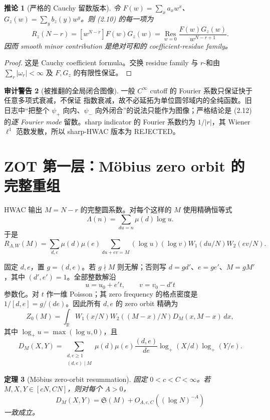 \documentclass[11pt,a4paper]{ctexart}
\newtheorem{theorem}{定理}[section]
\newtheorem{corollary}[theorem]{推论}
\theoremstyle{definition}
\newtheorem{warning}[theorem]{审计警告}
\newcommand{\1}{\mathbf 1}
\newcommand{\Res}{\operatorname*{Res}}
\newcommand{\REJECTED}{\textcolor{purple!75!black}{\textsf{REJECTED}}}
\begin{document}
\begin{corollary}[严格的 Cauchy 留数版本]
令 $F(w)=\sum_xa_xw^x$、$G_z(w)=\sum_yb_z(y)w^y$。则 (2.10) 的每一项为
\[
R_z(N-r)=[w^{N-r}]F(w)G_z(w)
=\Res_{w=0}\frac{F(w)G_z(w)}{w^{N-r+1}}.                \tag{2.12}
\]
因而 smooth minor contribution 是绝对可和的 coefficient-residue family。
\end{corollary}

\begin{proof}
这是 Cauchy coefficient formula。交换 residue family 与 $r$-和由
$\sum_r|\omega_r|<\infty$ 及 $F,G_z$ 的有限性保证。
\end{proof}

\begin{warning}[被推翻的全局闭合图像]
\sloppy
一般 $C^\infty$ cutoff 的 Fourier 系数只保证快于任意多项式衰减，不保证
指数衰减，故不必延拓为单位圆邻域内的全纯函数。旧日志中“把整个
$\psi_+$ 向内、$\psi_-$ 向外闭合”的说法只能作为图像；严格结论是
(2.12) 的\emph{逐 Fourier mode} 留数。sharp indicator 的 Fourier 系数约为
$1/|r|$，其 Wiener $\ell^1$ 范数发散，所以 sharp-HWAC 版本为 \REJECTED。
\end{warning}

\section{ZOT 第一层：Möbius zero orbit 的完整重组}

HWAC 输出 $M=N-r$ 的完整圆系数。对每个这样的 $M$ 使用精确恒等式
\[
\Lambda(n)=\sum_{du=n}\mu(d)\log u.                    \tag{3.1}
\]
于是
\[
R_{\Lambda,W}(M)
=\sum_{d,e}\mu(d)\mu(e)
 \sum_{du+ev=M}(\log u)(\log v)
 W_1(du/N)W_2(ev/N).                                    \tag{3.2}
\]

固定 $d,e$，置 $g=(d,e)$。若 $g\nmid M$ 则无解；否则写
$d=gd'$、$e=ge'$、$M=gM'$，其中 $(d',e')=1$。全部整数解沿
\[
u=u_0+e't,\qquad v=v_0-d't                              \tag{3.3}
\]
参数化。对 $t$ 作一维 Poisson；其 zero frequency 的格点密度是
$1/[d,e]=g/(de)$。因此所有 $d,e$ 的 zero orbit 精确为
\[
Z_0(M)=\int_{\mathbb R}W_1(x/N)W_2((M-x)/N)
D_M(x,M-x)\,dx,                                         \tag{3.4}
\]
其中 $\log_+u=\max(\log u,0)$，且
\[
D_M(X,Y)=
\sum_{\substack{d,e\ge1\\(d,e)\mid M}}
\mu(d)\mu(e)\frac{(d,e)}{de}
\log_+(X/d)\log_+(Y/e).                                \tag{3.5}
\]

\begin{theorem}[Möbius zero-orbit resummation]
固定 $0<c<C<\infty$。若 $M,X,Y\in[cN,CN]$，则对每个 $A>0$，
\[
\boxed{D_M(X,Y)=\mathfrak S(M)+O_{A,c,C}((\log N)^{-A})} \tag{3.6}
\]
一致成立。
\end{theorem}
\end{document}

